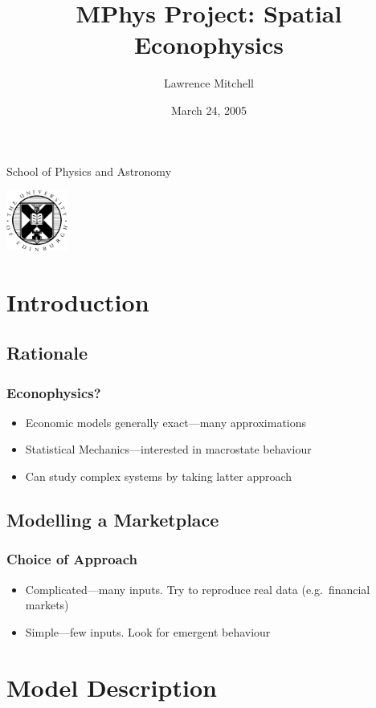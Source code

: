 \documentclass{beamer}
\title[Spatial Econophysics]{MPhys Project: Spatial Econophysics}
\author{Lawrence Mitchell}
\date{March 24, 2005}
\begin{document}
\frame
{
  \begin{minipage}[b]{0.75\textwidth}
     \large School of Physics and Astronomy
    \vspace*{8mm}
  \end{minipage}
  \hfill
  \begin{minipage}[t]{2cm}
    \includegraphics[width=20mm]{03-24-undergrad-project-presentation.figures/crest}
  \end{minipage}
  \titlepage
}

\section{Introduction}

\subsection{Rationale}

\frame
{
  \frametitle{Econophysics?}
  \begin{itemize}
    \setlength{\itemsep}{\baselineskip}
    \item<1-> Economic models generally exact---many approximations
    \item<2-> Statistical Mechanics---interested in
      macrostate behaviour
    \item<3-> Can study complex systems by taking latter approach
  \end{itemize}
}

\subsection{Modelling a Marketplace}

\frame
{
  \frametitle{Choice of Approach}
  \begin{itemize}
    \setlength{\itemsep}{\baselineskip}
    \item<1->Complicated---many inputs.  Try to reproduce
      real data (e.g.\ financial markets)
    \item<2->Simple---few inputs.  Look for emergent behaviour
  \end{itemize}
}


\section{Model Description}
\end{document}
